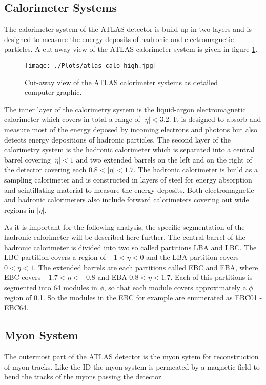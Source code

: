 \subsection{Calorimeter Systems}
The calorimeter system of the ATLAS detector is build up in two layers and is designed to measure the energy deposits of hadronic and electromagnetic particles.
A cut-away view of the ATLAS calorimeter system is given in figure \ref{Calo}.
\begin{figure}[H]
	\centering
	\texttt{[image: ./Plots/atlas-calo-high.jpg]}
	\caption{Cut-away view of the ATLAS calorimeter systems as detailed computer graphic.\cite{Aad:2008zzm}}
	\label{Calo}
\end{figure}
The inner layer of the calorimetry system is the liquid-argon electromagnetic calorimeter which covers in total a range of $|\eta| < 3.2$.
It is designed to absorb and measure most of the energy deposed by incoming electrons and photons but also detects energy depositions of hadronic particles.
The second layer of the calorimetry system is the hadronic calorimeter which is separated into a central barrel covering $|\eta| < 1$ and two extended barrels on the left and on the right of the detector covering each $0.8 < |\eta| < 1.7$.
The hadronic calorimeter is build as a sampling calorimeter and is constructed in layers of steel for energy absorption and scintillating material to measure the energy deposits.
Both electromagnetic and hadronic calorimeters also include forward calorimeters covering out wide regions in $|\eta|$.

As it is important for the following analysis, the specific segmentation of the hadronic calorimeter will be described here further.
The central barrel of the hadronic calorimeter is divided into two so called partitions LBA and LBC.
The LBC partition covers a region of $-1 < \eta < 0$ and the LBA partition covers $0 < \eta < 1$.
The extended barrels are each partitions called EBC and EBA, where EBC covers $-1.7 < \eta < -0.8$ and EBA $0.8 < \eta < 1.7$.
Each of this partitions is segmented into 64 modules in $\phi$, so that each module covers approximately a $\phi$ region of 0.1.
So the modules in the EBC for example are enumerated as EBC01 - EBC64.
\subsection{Myon System}
The outermost part of the ATLAS detector is the myon sytem for reconstruction of myon tracks.
Like the ID the myon system is permeated by a magnetic field to bend the tracks of the myons passing the detector.
